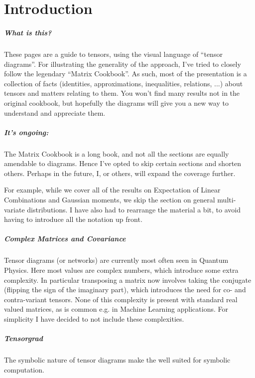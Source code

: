 
\chapter{Introduction}
\paragraph{What is this?}
These pages are a guide to tensors, using the visual language of ``tensor diagrams''.
For illustrating the generality of the approach, I've tried to closely follow the legendary ``Matrix Cookbook''.
As such, most of the presentation is a collection of facts (identities, approximations, inequalities, relations, ...) about tensors and matters relating to them.
You won't find many results not in the original cookbook, but hopefully the diagrams will give you a new way to understand and appreciate them.

\paragraph{It's ongoing:}
The Matrix Cookbook is a long book, and not all the sections are equally amendable to diagrams.
Hence I've opted to skip certain sections and shorten others.
Perhaps in the future, I, or others, will expand the coverage further.

For example, while we cover all of the results on Expectation of Linear Combinations and Gaussian moments, we skip the section on general multi-variate distributions.
I have also had to rearrange the material a bit, to avoid having to introduce all the notation up front.

\paragraph{Complex Matrices and Covariance}
Tensor diagrams (or networks) are currently most often seen in Quantum Physics.
Here most values are complex numbers, which introduce some extra complexity.
In particular transposing a matrix now involves taking the conjugate (flipping the sign of the imaginary part), which introduces the need for co- and contra-variant tensors.
None of this complexity is present with standard real valued matrices, as is common e.g. in Machine Learning applications.
For simplicity I have decided to not include these complexities.

\paragraph{Tensorgrad}
The symbolic nature of tensor diagrams make the well suited for symbolic computation.

